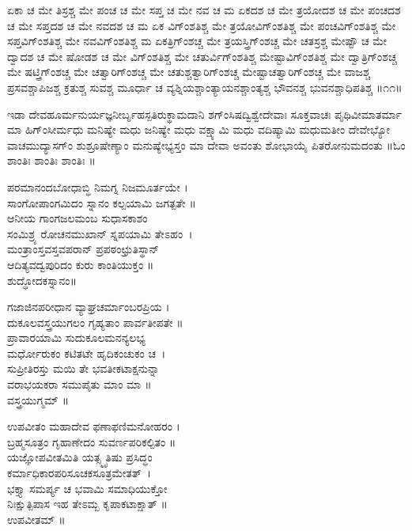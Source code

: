 ಏಕಾ ಚ ಮೇ ತಿಸ್ರಶ್ಚ ಮೇ ಪಂಚ ಚ ಮೇ ಸಪ್ತ ಚ ಮೇ ನವ ಚ ಮ ಏಕದಶ ಚ ಮೇ ತ್ರಯೋದಶ ಚ ಮೇ ಪಂಚದಶ ಚ ಮೇ ಸಪ್ತದಶ ಚ ಮೇ ನವದಶ ಚ ಮ ಏಕ ವಿಗ್ಂಶತಿಶ್ಚ ಮೇ ತ್ರಯೋವಿಗ್ಂಶತಿಶ್ಚ ಮೇ ಪಂಚವಿಗ್ಂಶತಿಶ್ಚ ಮೇ ಸಪ್ತವಿಗ್ಂಶತಿಶ್ಚ ಮೇ ನವವಿಗ್ಂಶತಿಶ್ಚ ಮ ಏಕತ್ರಿಗ್ಂಶಚ್ಚ ಮೇ ತ್ರಯಸ್ತ್ರಿಗ್ಂಶಚ್ಚ ಮೇ ಚತಸ್ರಶ್ಚ ಮೇಷ್ಟೌ ಚ ಮೇ ದ್ವಾದಶ ಚ ಮೇ ಷೋಡಶ ಚ ಮೇ ವಿಗ್ಂಶತಿಶ್ಚ ಮೇ ಚತುರ್ವಿಗ್ಂಶತಿಶ್ಚ ಮೇಷ್ಟಾವಿಗ್ಂಶತಿಶ್ಚ ಮೇ ದ್ವಾತ್ರಿಗ್ಂಶಚ್ಚ ಮೇ ಷಟ್ತ್ರಿಗ್ಂಶಚ್ಚ ಮೇ ಚತ್ವಾರಿಗ್ಂಶಚ್ಚ ಮೇ ಚತುಶ್ಚತ್ವಾರಿಗ್ಂಶಚ್ಚ ಮೇಷ್ಟಾಚತ್ವಾರಿಗ್ಂಶಚ್ಚ ಮೇ ವಾಜಶ್ಚ ಪ್ರಸವಶ್ಚಾಪಿಜಶ್ಚ ಕ್ರತುಶ್ಚ ಸುವಶ್ಚ ಮೂರ್ಧಾ ಚ ವ್ಯಶ್ನಿಯಶ್ಚಾಂತ್ಯಾಯನಶ್ಚಾಂತ್ಯಶ್ಚ ಭೌವನಶ್ಚ ಭುವನಶ್ಚಾಧಿಪತಿಶ್ಚ ॥೧೧॥

ಇಡಾ ದೇವಹೂರ್ಮನುರ್ಯಜ್ಞನೀರ್ಬೃಹಸ್ಪತಿರುಕ್ಥಾಮದಾನಿ ಶಗ್ಂಸಿಷದ್ವಿಶ್ವೇದೇವಾಃ ಸೂಕ್ತವಾಚಃ ಪೃಥಿವೀಮಾತರ್ಮಾ ಮಾ ಹಿಗ್ಂಸೀರ್ಮಧು ಮನಿಷ್ಯೇ ಮಧು ಜನಿಷ್ಯೇ ಮಧು ವಕ್ಷ್ಯಾಮಿ ಮಧು ವದಿಷ್ಯಾಮಿ ಮಧುಮತೀಂ ದೇವೇಭ್ಯೋ ವಾಚಮುದ್ಯಾಸಗ್ಂ ಶುಶ್ರೂಷೇಣ್ಯಾಂ ಮನುಷ್ಯೇಭ್ಯಸ್ತಂ ಮಾ ದೇವಾ ಅವಂತು ಶೋಭಾಯೈ ಪಿತರೋನುಮದಂತು ॥ಓಂ ಶಾಂತಿಃ ಶಾಂತಿಃ ಶಾಂತಿಃ ॥

ಪರಮಾನಂದಬೋಧಾಬ್ಧಿ ನಿಮಗ್ನ ನಿಜಮೂರ್ತಯೇ ।\\
ಸಾಂಗೋಪಾಂಗಮಿದಂ ಸ್ನಾನಂ ಕಲ್ಪಯಾಮಿ ಜಗತ್ಪತೇ ॥\\
ಆನೀಯ ಗಾಂಗಜಲಮಂಬ ಸುಧಾಸಕಾಶಂ \\ಸಂಮಿಶ್ರ್ಯ ರೋಚನಮುಖಾನ್ ಸ್ನಪಯಾಮಿ ತೇಽಹಂ~।\\
ಮಂತ್ರಾಂಸ್ತವಸ್ತವಪರಾನ್ ಪ್ರಪಠಂಛ್ರುತಿಸ್ಥಾನ್ \\ಆದಿತ್ಯವದ್ವಪುರಿದಂ ಕುರು ಕಾಂತಿಯುಕ್ತಂ ॥\\
ಶುದ್ಧೋದಕಸ್ನಾನಂ॥

ಗಜಾಜಿನಪರೀಧಾನ ವ್ಯಾಘ್ರಚರ್ಮಾಂಬರಪ್ರಿಯ ।\\
ದುಕೂಲವಸ್ತ್ರಯುಗಲಂ ಗೃಹ್ಯತಾಂ ಪಾರ್ವತೀಪತೇ ॥ \\
ಪ್ರಾವಾರಯಾಮಿ ಸುದುಕೂಲಮನನ್ಯಲಭ್ಯ\\ಮರ್ಧೋರುಕಂ ಕಟಿತಟೇ ಹೃದಿಕಂಚುಕಂ ಚ~।\\
ಸುಪ್ರೀತಿರಸ್ತು ಮಯಿ ತೇ ಭವತೀಕಟಾಕ್ಷನುನ್ನಾ \\ವರಾಭಯಕರಾ ಸಮುಪೈತು ಮಾಂ ಮಾ ॥\\
ವಸ್ತ್ರಯುಗ್ಮಮ್ ॥

ಉಪವೀತಂ ಮಹಾದೇವ ಫಣಾಫಣಿಮನೋಹರಂ ।\\
ಬ್ರಹ್ಮಸೂತ್ರಂ ಗೃಹಾಣೇದಂ ಸುವರ್ಣಪರಿಕಲ್ಪಿತಂ ॥\\
ಯಜ್ಞೋಪವೀತಮಿತಿ ಯತ್ಸ್ಮೃತಿಷು ಪ್ರಸಿದ್ಧಂ\\ ಕರ್ಮಾಧಿಕಾರಪರಿಸೂಚಕಸೂತ್ರಮೇತತ್~।\\
ಭಕ್ತ್ಯಾ ಸಮರ್ಪ್ಯ ಚ ಭವಾಮಿ ಸಮಾಧಿಯುಕ್ತೋ \\ನಿಃಕ್ಷುತ್ಪಿಪಾಸ ಇಹ ತೇಽಮ್ಬ ಕೃಪಾಕಟಾಕ್ಷಾತ್ ॥\\
 ಉಪವೀತಮ್ ॥

